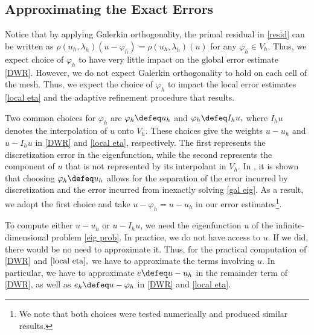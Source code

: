 \subsection{Approximating the Exact Errors}



Notice that by applying Galerkin orthogonality, the primal residual in \eqref{resid} can be written as $\rho(u_h, \lambda_h)(u-\varphi_h) = \rho(u_h, \lambda_h)(u)$ for any $\varphi_h \in V_h.$ Thus, we expect choice of $\varphi_h$ to have very little impact on the global error estimate \eqref{DWR}. However, we do not expect Galerkin orthogonality to hold on each cell of the mesh. Thus, we expect the choice of $\varphi_h$ to impact the local error estimates \eqref{local eta} and the adaptive refinement procedure that results.


Two common choices for $\varphi_h$ are $\varphi_h \defeq u_h$ and $\varphi_h  \defeq I_h u,$ where $I_hu$ denotes the interpolation of $u$ onto $V_h.$ These choices give the weights $u - u_h$ and $u - I_h u$ in \eqref{DWR} and \eqref{local eta}, respectively. The first represents the discretization error in the eigenfunction, while the second represents the component of $u$ that is not represented by its interpolant in $V_h.$ In \cite{balance_errs}, it is shown that choosing $\varphi_h \defeq u_h$ allows for the separation of the error incurred by discretization and the error incurred from inexactly solving \eqref{gal eig}. As a result, we adopt the first choice and take $u- \varphi_h = u - u_h$ in our error estimates\footnote{We note that both choices were tested numerically and produced similar results.}.

To compute either $u-u_h$ or $u - I_h u$, we need the eigenfunction $u$ of the infinite-dimensional problem \eqref{eig prob}. In practice, we do not have access to $u.$ If we did, there would be no need to approximate it. Thus, for the practical computation of \eqref{DWR} and $\eqref{local eta},$ we have to approximate the terms involving $u.$ In particular, we have to approximate $e \defeq u-u_h$ in the remainder term of \eqref{DWR}, as well as $e_h \defeq u - \varphi_h$ in \eqref{DWR} and \eqref{local eta}. 

